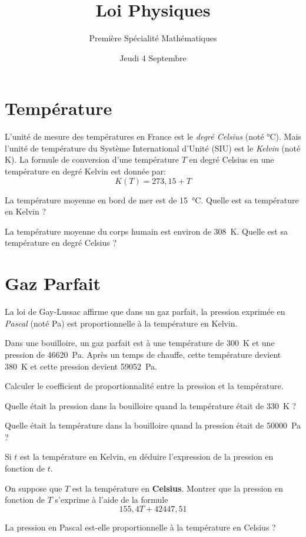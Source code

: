 \documentclass{article}
\title{Loi Physiques}
\author{Première Spécialité Mathématiques}
\date{Jeudi 4 Septembre}
\begin{document}
\maketitle

\section{Température}

L'unité de mesure des températures en France est le \emph{degré Celsius} (noté \unit{\celsius}). Mais l'unité de température du Système International d'Unité (SIU) est le \emph{Kelvin} (noté \unit{\kelvin}). La formule de conversion d'une température $T$ en degré Celsius en une température en degré Kelvin est donnée par:
\begin{equation*}
K(T) = 273,15 + T
\end{equation*}
\begin{alphaquestions}
\item La température moyenne en bord de mer est de \qty{15}{\celsius}. Quelle est sa température en Kelvin ?
\item La température moyenne du corps humain est environ de \qty{308}{\kelvin}. Quelle est sa température en degré Celsius ? 
\end{alphaquestions}
\section{Gaz Parfait}
La loi de Gay-Lussac affirme que dans un gaz parfait, la pression exprimée en \emph{Pascal} (noté \unit{\pascal}) est proportionnelle à la température en Kelvin.

Dans une bouilloire, un gaz parfait est à une température de \qty{300}{\kelvin} et une pression de \qty{46620}{\pascal}. Après un temps de chauffe, cette température devient \qty{380}{\kelvin} et cette pression devient \qty{59052}{\pascal}. 
\begin{alphaquestions}
\item Calculer le coefficient de proportionnalité entre la pression et la température.
\item Quelle était la pression dans la bouilloire quand la température était de \qty{330}{\kelvin} ?
\item Quelle était la température dans la bouilloire quand la pression était de \qty{50000}{\pascal} ?
\item Si $t$ est la température en Kelvin, en déduire l'expression de la pression en fonction de $t$.
\item On suppose que $T$ est la température en \textbf{Celsius}. Montrer que la pression en fonction de $T$ s'exprime à l'aide de la formule
\begin{equation*}
155,4T + 42447,51  
\end{equation*}
\item La pression en Pascal est-elle proportionnelle à la température en Celsius ?
\end{alphaquestions}
\end{document}
